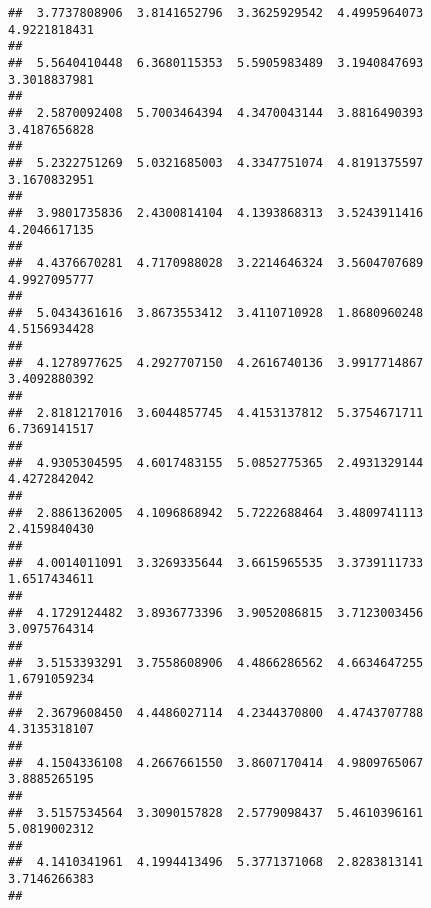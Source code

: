 \documentclass[]{article}
\begin{document}
\begin{verbatim}
##  3.7737808906  3.8141652796  3.3625929542  4.4995964073  4.9221818431 
##                                                                       
##  5.5640410448  6.3680115353  5.5905983489  3.1940847693  3.3018837981 
##                                                                       
##  2.5870092408  5.7003464394  4.3470043144  3.8816490393  3.4187656828 
##                                                                       
##  5.2322751269  5.0321685003  4.3347751074  4.8191375597  3.1670832951 
##                                                                       
##  3.9801735836  2.4300814104  4.1393868313  3.5243911416  4.2046617135 
##                                                                       
##  4.4376670281  4.7170988028  3.2214646324  3.5604707689  4.9927095777 
##                                                                       
##  5.0434361616  3.8673553412  3.4110710928  1.8680960248  4.5156934428 
##                                                                       
##  4.1278977625  4.2927707150  4.2616740136  3.9917714867  3.4092880392 
##                                                                       
##  2.8181217016  3.6044857745  4.4153137812  5.3754671711  6.7369141517 
##                                                                       
##  4.9305304595  4.6017483155  5.0852775365  2.4931329144  4.4272842042 
##                                                                       
##  2.8861362005  4.1096868942  5.7222688464  3.4809741113  2.4159840430 
##                                                                       
##  4.0014011091  3.3269335644  3.6615965535  3.3739111733  1.6517434611 
##                                                                       
##  4.1729124482  3.8936773396  3.9052086815  3.7123003456  3.0975764314 
##                                                                       
##  3.5153393291  3.7558608906  4.4866286562  4.6634647255  1.6791059234 
##                                                                       
##  2.3679608450  4.4486027114  4.2344370800  4.4743707788  4.3135318107 
##                                                                       
##  4.1504336108  4.2667661550  3.8607170414  4.9809765067  3.8885265195 
##                                                                       
##  3.5157534564  3.3090157828  2.5779098437  5.4610396161  5.0819002312 
##                                                                       
##  4.1410341961  4.1994413496  5.3771371068  2.8283813141  3.7146266383 
##                                                                       

\end{verbatim}
\end{document}
